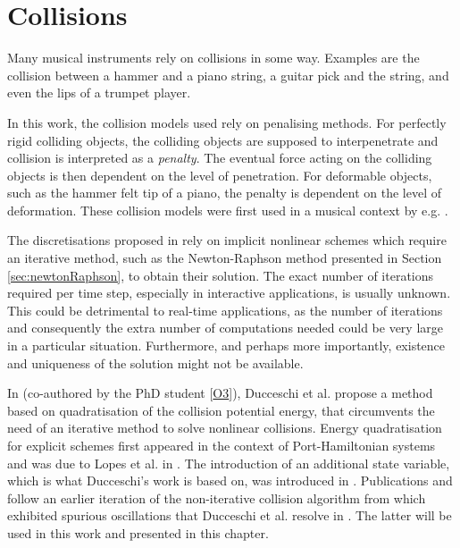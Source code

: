 \chapter{Collisions}\label{ch:collisions}
Many musical instruments rely on collisions in some way. Examples are the collision between a hammer and a piano string, a guitar pick and the string, and even the lips of a trumpet player. 

In this work, the collision models used rely on penalising methods. For perfectly rigid colliding objects, the colliding objects are supposed to interpenetrate and collision is interpreted as a \textit{penalty}. The eventual force acting on the colliding objects is then dependent on the level of penetration. For deformable objects, such as the hammer felt tip of a piano, the penalty is dependent on the level of deformation. These collision models were first used in a musical context by e.g. \cite{Chatziioannou2013, Bilbao2014}.

The discretisations proposed in \cite{Chatziioannou2013, Bilbao2014} rely on implicit nonlinear schemes which require an iterative method, such as the Newton-Raphson method presented in Section \ref{sec:newtonRaphson}, to obtain their solution. 
The exact number of iterations required per time step, especially in interactive applications, is usually unknown. This could be detrimental to real-time applications, as the number of iterations and consequently the extra number of computations needed could be very large in a particular situation. Furthermore, and perhaps more importantly, existence and uniqueness of the solution might not be available. 

In \cite{Ducceschi2021} (co-authored by the PhD student [\hyperref[ch:listOfPublications]{O3}]), Ducceschi et al. propose a method based on quadratisation of the collision potential energy, that circumvents the need of an iterative method to solve nonlinear collisions. Energy quadratisation for explicit schemes first appeared in the context of Port-Hamiltonian systems and was due to Lopes et al. in \cite{Lopes2015}. The introduction of an additional state variable, which is what Ducceschi's work is based on, was introduced in \cite{Yang2017, Jiang2019}. Publications \citeP[D] and \citeP[E] follow an earlier iteration of the non-iterative collision algorithm from \cite{Ducceschi2019, Bilbao2019} which exhibited spurious oscillations that Ducceschi et al. resolve in \cite{Ducceschi2021}. The latter will be used in this work and presented in this chapter. 


